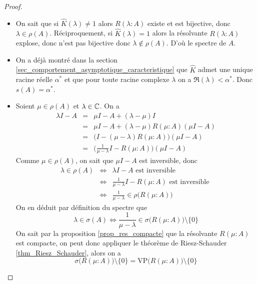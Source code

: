 \begin{proof}
    \begin{itemize}
        \item On sait que si $\hat{K}(\lambda) \neq 1$ alors $R(\lambda : A)$ existe et est bijective, donc $\lambda \in \rho(A)$. Réciproquement, si $\hat{K}(\lambda)=1$ alors la résolvante $R(\lambda :A)$ explose, donc n'est pas bijective donc $\lambda \notin \rho(A)$. D'où le spectre de $A$.
        \item On a déjà montré dans la section \ref{sec_comportement_asymptotique_caracteristique} que $\hat{K}$ admet une unique racine réelle $\alpha^*$ et que pour toute racine complexe $\lambda$ on a $\Re(\lambda) < \alpha^*$. Donc $s(A)=\alpha^*$.
        \item Soient $\mu \in \rho(A)$ et $\lambda \in \mathbb{C}$. On a 
        \begin{eqnarray*}
            \lambda I - A &=& \mu I - A +(\lambda - \mu)I \\
            &=& \mu I -A + (\lambda - \mu)R(\mu : A)(\mu I - A) \\
            &=& \big(I-(\mu - \lambda)R(\mu : A)\big)(\mu I - A) \\
            &=& \Big(\frac{1}{\mu - \lambda}I - R(\mu : A)\Big)(\mu I - A)
        \end{eqnarray*}
        Comme $\mu \in \rho(A)$, on sait que $\mu I -A$ est inversible, donc 
        \begin{eqnarray*}
            \lambda \in \rho(A) &\iff& \lambda I - A \text{ est inversible } \\
            &\iff& \frac{1}{\mu - \lambda}I - R(\mu : A) \text{ est inversible } \\
            &\iff& \frac{1}{\mu - \lambda} \in \rho\big(R(\mu : A)\big)
        \end{eqnarray*}
        On en déduit par définition du spectre que 
        \begin{equation*}
            \lambda \in \sigma(A) \iff \frac{1}{\mu - \lambda} \in \sigma\big(R(\mu : A)\big) \setminus \{0\}
        \end{equation*}
        On sait par la proposition \ref{prop_res_compacte} que la résolvante $R(\mu : A)$ est compacte, on peut donc appliquer le théorème de Riesz-Schauder \ref{thm_Riesz_Schauder}, alors on a 
        \begin{equation*}
            \sigma\big(R(\mu : A)\big) \setminus \{0\} = \mathrm{VP}\big(R(\mu: A)\big) \setminus \{0\}
        \end{equation*}

\end{itemize}
\end{proof}
